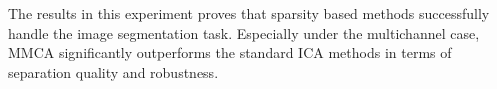 The results in this experiment proves that sparsity based methods successfully handle the image segmentation task. Especially under the multichannel case, MMCA significantly outperforms the standard ICA methods in terms of separation quality and robustness.\\




\begin{figure}[!htbp]
\centering
{}
\end{figure}
